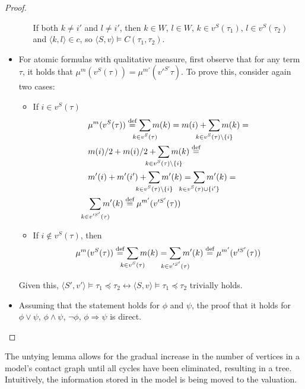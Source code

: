 \documentclass{article}
\newcommand{\lcont}{C}
\newcommand{\lmeasure}{\preceq}
\newcommand{\eqdef}{\stackrel{\text{def}}{=}}
\begin{document}
\begin{proof}
\begin{itemize}
\begin{itemize}
      If both $k \neq i'$ and $l \neq i'$, then $k \in W$, $l \in W$, $k \in v^S(\tau_1)$, $l \in v^S(\tau_2)$ and $\langle k, l \rangle \in c$, so $\langle S, v \rangle \models \lcont(\tau_1, \tau_2)$.
    \end{itemize}
  \item For atomic formulas with qualitative measure, first observe that for any term $\tau$, it holds that $\mu^m(v^S(\tau)) = \mu^{m'}(v'^{S'}\tau)$. To prove this, consider again two cases:
    \begin{itemize}
    \item If $i \in v^S(\tau)$
      \begin{align*}
        & \mu^m(v^S(\tau)) \eqdef \sum_{\mathclap{k \in v^S(\tau)}}m(k) = m(i) + \sum_{\mathclap{k \in v^S(\tau) \setminus \{i\}}}m(k) = \\
        & m(i) / 2 + m(i) / 2 + \sum_{\mathclap{k \in v^S(\tau) \setminus \{i\}}}m(k) \eqdef \\
        & m'(i) + m'(i') + \sum_{\mathclap{k \in v^S(\tau) \setminus \{i\}}}m'(k) = \sum_{\mathclap{k \in v^S(\tau) \cup \{i'\}}}m'(k) = \\
        & \sum_{\mathclap{k \in v'^{S'}(\tau)}}m'(k) \eqdef \mu^{m'}(v'^{S'}(\tau))
      \end{align*}
    \item If $i \not \in v^S(\tau)$, then
      \begin{equation*}
        \mu^m(v^S(\tau)) \eqdef \sum_{\mathclap{k \in v^S(\tau)}}m(k) = \sum_{\mathclap{k \in v'^{S'}(\tau)}}m'(k) \eqdef \mu^{m'}(v'^{S'}(\tau))
      \end{equation*}
    \end{itemize}
    Given this, $\langle S', v' \rangle \models \tau_1 \lmeasure \tau_2 \longleftrightarrow \langle S, v \rangle \models \tau_1 \lmeasure \tau_2$ trivially holds.
  \item Assuming that the statement holds for $\phi$ and $\psi$, the proof that it holds for $\phi \lor \psi$, $\phi \land \psi$, $\lnot \phi$, $\phi \Rightarrow \psi$ is direct.
\end{itemize}
\end{proof}

The untying lemma allows for the gradual increase in the number of vertices in a model's contact graph until all cycles have been eliminated, resulting in a tree. Intuitively, the information stored in the model is being moved to the valuation.
\end{document}
